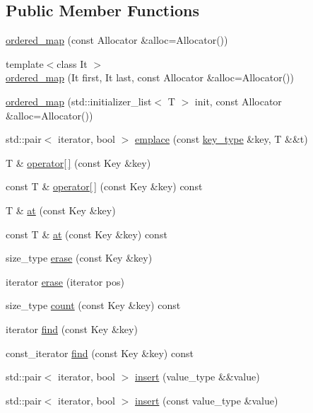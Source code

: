 \subsection*{Public Member Functions}
\begin{DoxyCompactItemize}
\item 
\hyperlink{structnlohmann_1_1ordered__map_a87938c10b76510dac00412d2cb5fd1e4}{ordered\+\_\+map} (const Allocator \&alloc=Allocator())
\item 
{\footnotesize template$<$class It $>$ }\\\hyperlink{structnlohmann_1_1ordered__map_a9d25efb51325cc1be027b8ea00c1f8b8}{ordered\+\_\+map} (It first, It last, const Allocator \&alloc=Allocator())
\item 
\hyperlink{structnlohmann_1_1ordered__map_a0482ea79e7786367a2d9b5c789c091ce}{ordered\+\_\+map} (std\+::initializer\+\_\+list$<$ T $>$ init, const Allocator \&alloc=Allocator())
\item 
std\+::pair$<$ iterator, bool $>$ \hyperlink{structnlohmann_1_1ordered__map_a38834c948b844033caa7d5c76fee5866}{emplace} (const \hyperlink{structnlohmann_1_1ordered__map_a57095c6ed403f02e1bc2c240a13c9ed8}{key\+\_\+type} \&key, T \&\&t)
\item 
T \& \hyperlink{structnlohmann_1_1ordered__map_ae7a1ca8c1e234837d137471f73ae6012}{operator\mbox{[}$\,$\mbox{]}} (const Key \&key)
\item 
const T \& \hyperlink{structnlohmann_1_1ordered__map_ab9142d04f88a7d909e41b16827b40476}{operator\mbox{[}$\,$\mbox{]}} (const Key \&key) const 
\item 
T \& \hyperlink{structnlohmann_1_1ordered__map_ab7b4bb185fe7ea84f8f5f32fd230ff91}{at} (const Key \&key)
\item 
const T \& \hyperlink{structnlohmann_1_1ordered__map_a0794a397538be6baf5278348436b8aa8}{at} (const Key \&key) const 
\item 
size\+\_\+type \hyperlink{structnlohmann_1_1ordered__map_a583c8976bbf0c137ff8e2439878f3058}{erase} (const Key \&key)
\item 
iterator \hyperlink{structnlohmann_1_1ordered__map_a26053569acb0a858d87482b2fa3d5dc5}{erase} (iterator pos)
\item 
size\+\_\+type \hyperlink{structnlohmann_1_1ordered__map_aaf916b4375dac60b8a11aa45c52a40d3}{count} (const Key \&key) const 
\item 
iterator \hyperlink{structnlohmann_1_1ordered__map_a2486527ac56e07d58946ae9a93a46bc8}{find} (const Key \&key)
\item 
const\+\_\+iterator \hyperlink{structnlohmann_1_1ordered__map_a80eb860fa67c96c1a3231079fa1a2188}{find} (const Key \&key) const 
\item 
std\+::pair$<$ iterator, bool $>$ \hyperlink{structnlohmann_1_1ordered__map_a48eceff729b80f3f4a023b737efccc5b}{insert} (value\+\_\+type \&\&value)
\item 
std\+::pair$<$ iterator, bool $>$ \hyperlink{structnlohmann_1_1ordered__map_a0241433138719e477a3cbb0c4cf0a243}{insert} (const value\+\_\+type \&value)
\end{DoxyCompactItemize}



